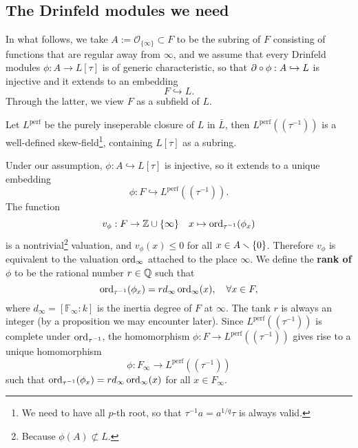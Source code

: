 \documentclass{article}
\newcommand{\F}{\mathbb{F}}
\newcommand{\perf}{\mathrm{perf}}
\renewcommand{\O}{\mathcal{O}}
\begin{document}


\subsection{The Drinfeld modules we need}

In what follows, we take $A := \O_{\{\infty\}}\subset F$ to be the subring of $F$ consisting of functions that are regular away from $\infty$,
and we assume that every Drinfeld modules $\phi : A\to L[\tau]$ is of generic characteristic,
so that $\partial\circ \phi : A\hookrightarrow L$ is injective and it extends to an embedding \[F\hookrightarrow L.\]
Through the latter, we view $F$ as a subfield of $L$.


Let $L^\perf$ be the purely inseperable closure of $L$ in $\bar L$,
then $L^\perf((\tau^{-1}))$ is a well-defined skew-field\footnote{
    We need to have all $p$-th root,
    so that $\tau^{-1}a = a^{1/q}\tau$ is always valid.
}, containing $L[\tau]$ as a subring.


Under our assumption,
$\phi : A\hookrightarrow L[\tau]$ is injective, so it extends to a unique embedding
\[\phi : F\hookrightarrow L^{\perf}((\tau^{-1})).\]
The function \[v_\phi : F\to \mathbb{Z}\cup\{\infty\}\quad x\mapsto \operatorname{ord}_{\tau^{-1}}(\phi_x) \]
is a nontrivial\footnote{
    Because $\phi(A)\not\subset L$.
} valuation, and $v_\phi(x)\le 0$ for all $x\in A\smallsetminus\{0\}$.
Therefore $v_\phi$ is equivalent to the valuation $\operatorname{ord}_\infty$ attached to the place $\infty$.
We define the \textbf{rank of $\phi$} to be the rational number $r\in\mathbb{Q}$ such that
\[\operatorname{ord}_{\tau^{-1}}(\phi_x) = rd_\infty\operatorname{ord}_\infty(x),\quad\forall x\in F,\]
where $d_\infty = [\F_\infty : k]$ is the inertia degree of $F$ at $\infty$.
The tank $r$ is always an integer (by a proposition we may encounter later).
Since $L^\perf((\tau^{-1}))$ is complete under $\operatorname{ord}_{\tau^{-1}}$, the homomorphism $\phi : F\to L^\perf((\tau^{-1}))$ gives rise to a unique homomorphism
\[\phi : F_\infty\to L^\perf((\tau^{-1}))\]
such that $\operatorname{ord}_{\tau^{-1}}(\phi_x) = rd_\infty\operatorname{ord}_\infty(x)$ for all $x\in F_\infty$.
\end{document}
